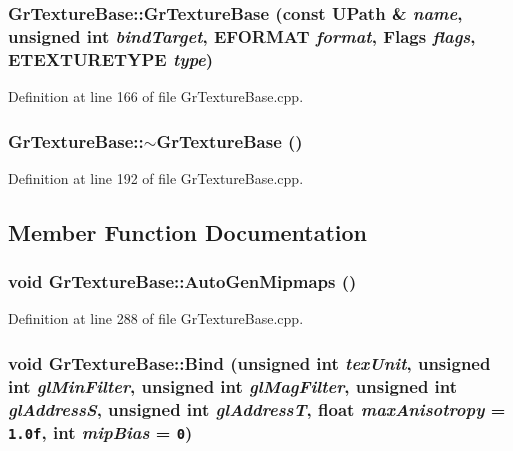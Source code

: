 \begin{CompactItemize}
{\subsubsection[{GrTextureBase}]{\setlength{\rightskip}{0pt plus 5cm}GrTextureBase::GrTextureBase (const {\bf UPath} \& {\em name}, \/  unsigned int {\em bindTarget}, \/  {\bf EFORMAT} {\em format}, \/  {\bf Flags} {\em flags}, \/  {\bf ETEXTURETYPE} {\em type})}}
\label{class_gr_texture_base_3927e8796074e075c490b8a1827ccc3b}




Definition at line 166 of file GrTextureBase.cpp.\hypertarget{class_gr_texture_base_dac31ced75ce320ff6aa16373b225085}{
\subsubsection[{$\sim$GrTextureBase}]{\setlength{\rightskip}{0pt plus 5cm}GrTextureBase::$\sim$GrTextureBase ()}}
\label{class_gr_texture_base_dac31ced75ce320ff6aa16373b225085}




Definition at line 192 of file GrTextureBase.cpp.

\subsection{Member Function Documentation}
\hypertarget{class_gr_texture_base_54326c425dda6eea167e84f45ca46ff3}{
\subsubsection[{AutoGenMipmaps}]{\setlength{\rightskip}{0pt plus 5cm}void GrTextureBase::AutoGenMipmaps ()}}
\label{class_gr_texture_base_54326c425dda6eea167e84f45ca46ff3}




Definition at line 288 of file GrTextureBase.cpp.\hypertarget{class_gr_texture_base_2e8a9316666ee28a1fc47e90d7929f6a}{
\subsubsection[{Bind}]{\setlength{\rightskip}{0pt plus 5cm}void GrTextureBase::Bind (unsigned int {\em texUnit}, \/  unsigned int {\em glMinFilter}, \/  unsigned int {\em glMagFilter}, \/  unsigned int {\em glAddressS}, \/  unsigned int {\em glAddressT}, \/  float {\em maxAnisotropy} = {\tt 1.0f}, \/  int {\em mipBias} = {\tt 0})}}
\label{class_gr_texture_base_2e8a9316666ee28a1fc47e90d7929f6a}





\end{CompactItemize}
